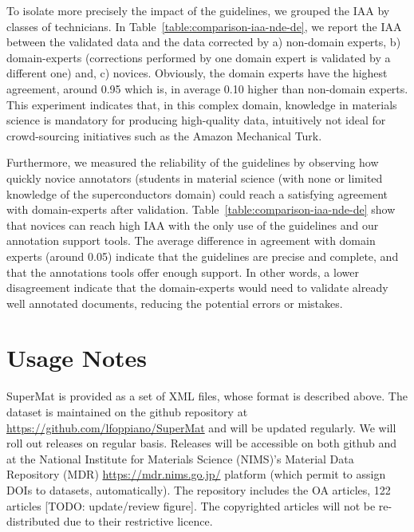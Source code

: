 \documentclass[fleqn,10pt]{wlscirep}
\begin{document}
To isolate more precisely the impact of the guidelines, we grouped the IAA by classes of technicians. 
In Table~\ref{table:comparison-iaa-nde-de}, we report the IAA between the validated data and the data corrected by a) non-domain experts, b) domain-experts (corrections performed by one domain expert is validated by a different one) and, c) novices. 
Obviously, the domain experts have the highest agreement, around 0.95 which is, in average 0.10 higher than non-domain experts. 
This experiment indicates that, in this complex domain, knowledge in materials science is mandatory for producing high-quality data, intuitively not ideal for crowd-sourcing initiatives such as the Amazon Mechanical Turk. 

Furthermore, we measured the reliability of the guidelines by observing how quickly novice annotators (students in material science (with none or limited knowledge of the superconductors domain) could reach a satisfying agreement with domain-experts after validation.
Table~\ref{table:comparison-iaa-nde-de} show that novices can reach high IAA with the only use of the guidelines and our annotation support tools. The average difference in agreement with domain experts (around 0.05) indicate that the guidelines are precise and complete, and that the annotations tools offer enough support. 
In other words, a lower disagreement indicate that the domain-experts would need to validate already well annotated documents, reducing the potential errors or mistakes. 

\section*{Usage Notes}
\label{sec:usage-notes}
SuperMat is provided as a set of XML files, whose format is described above. 
The dataset is maintained on the github repository at \url{https://github.com/lfoppiano/SuperMat} and will be updated regularly. 
We will roll out releases on regular basis. Releases will be accessible on both github and at the National Institute for Materials Science (NIMS)'s Material Data Repository (MDR) \url{https://mdr.nims.go.jp/} platform (which permit to assign DOIs to datasets, automatically).
The repository includes the OA articles, 122 articles [TODO: update/review figure]. 
The copyrighted articles will not be re-distributed due to their restrictive licence.
\end{document}
